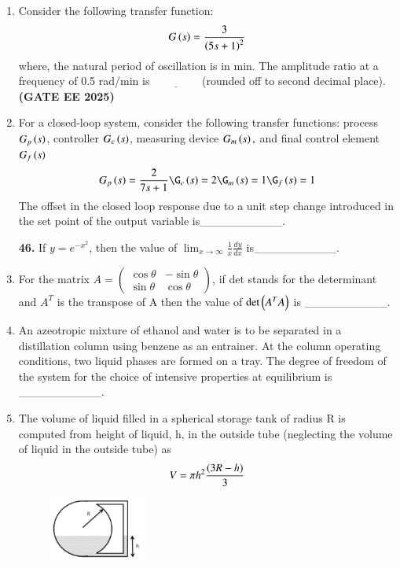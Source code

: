 \documentclass[journal,12pt,onecolumn]{IEEEtran}
\theoremstyle{remark}
\begin{document}
\begin{enumerate}
\item Consider the following transfer function:
	\begin{align} G\left(s\right)=\frac{3}{\left(5s+1\right)^{2}} \end{align}
where, the natural period of oscillation is in min. The amplitude ratio at a frequency of 0.5 rad/min is$\underline{\hspace{2cm}}$(rounded off to second decimal place). \hfill \textbf{(GATE EE 2025)} 


\item For a closed-loop system, consider the following transfer functions:
process $G_{p}\left(s\right)$, controller $G_{c}\left(s\right)$, measuring device $G_{m}\left(s\right),$ and final control element $G_{f}\left(s\right)$
\begin{align} G_{p}\brak{s} = \frac{2}{7s+1}
\G_{c}\brak{s}=2 
\G_{m}\brak{s}=1 
\G_{f}\brak{s}=1 \end{align}
The offset in the closed loop response due to a unit step change introduced in the set point of the output variable is\_\_\_\_\_\_\_\_\_\_.




\noindent\textbf{46.} If $y=e^{-x^{2}}$, then the value of $\lim_{x\rightarrow\infty}\frac{1}{x}\frac{dy}{dx}$ is\_\_\_\_\_\_\_\_\_\_.



\item For the matrix $A = \begin{pmatrix} \cos\theta & -\sin\theta \\ \sin\theta & \cos\theta \end{pmatrix}$, if det stands for the determinant and $A^{T}$ is the transpose of A then the value of $\det\left(A^{T}A\right)$ is \_\_\_\_\_\_\_\_\_\_.



\item An azeotropic mixture of ethanol and water is to be separated in a distillation column using benzene as an entrainer. At the column operating conditions, two liquid phases are formed on a tray. The degree of freedom of the system for the choice of intensive properties at equilibrium is \_\_\_\_\_\_\_\_\_\_.




\item The volume of liquid filled in a spherical storage tank of radius R is computed from height of liquid, h, in the outside tube (neglecting the volume of liquid in the outside tube) as
\[ V=\pi h^{2}\frac{\left(3R-h\right)}{3} \]
\begin{figure}
\begin{center}
\includegraphics[width=0.3\textwidth]{figs/49.png}
     \caption{}
     \label{fig49}


\end{center}
\end{figure}
\end{enumerate}
\end{document}
